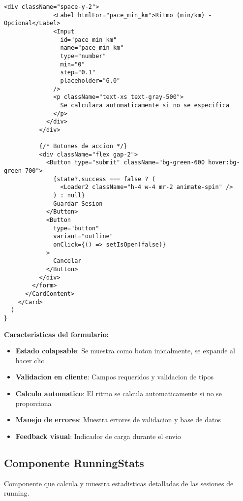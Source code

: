 \documentclass[12pt,a4paper]{article}
\begin{document}
\begin{lstlisting}[caption=components/running/running-form.tsx - Estructura principal]
            <div className="space-y-2">
              <Label htmlFor="pace_min_km">Ritmo (min/km) - Opcional</Label>
              <Input 
                id="pace_min_km" 
                name="pace_min_km" 
                type="number" 
                min="0" 
                step="0.1" 
                placeholder="6.0" 
              />
              <p className="text-xs text-gray-500">
                Se calculara automaticamente si no se especifica
              </p>
            </div>
          </div>

          {/* Botones de accion */}
          <div className="flex gap-2">
            <Button type="submit" className="bg-green-600 hover:bg-green-700">
              {state?.success === false ? (
                <Loader2 className="h-4 w-4 mr-2 animate-spin" />
              ) : null}
              Guardar Sesion
            </Button>
            <Button 
              type="button" 
              variant="outline" 
              onClick={() => setIsOpen(false)}
            >
              Cancelar
            </Button>
          </div>
        </form>
      </CardContent>
    </Card>
  )
}
\end{lstlisting}

\textbf{Caracteristicas del formulario:}
\begin{itemize}
    \item \textbf{Estado colapsable}: Se muestra como boton inicialmente, se expande al hacer clic
    \item \textbf{Validacion en cliente}: Campos requeridos y validacion de tipos
    \item \textbf{Calculo automatico}: El ritmo se calcula automaticamente si no se proporciona
    \item \textbf{Manejo de errores}: Muestra errores de validacion y base de datos
    \item \textbf{Feedback visual}: Indicador de carga durante el envio
\end{itemize}

\subsection{Componente RunningStats}

Componente que calcula y muestra estadisticas detalladas de las sesiones de running.
\end{document}
